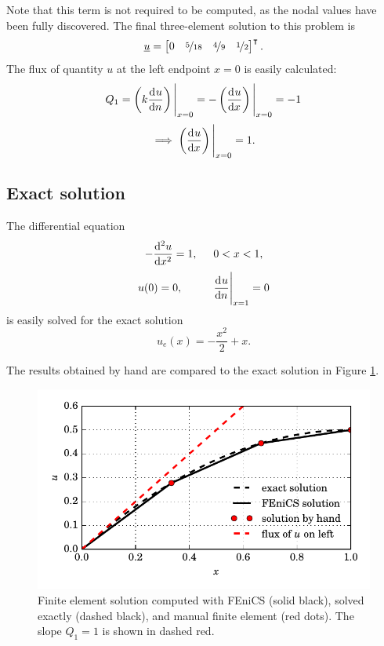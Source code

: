 Note that this term is not required to be computed, as the nodal values have been fully discovered.  The final three-element solution to this problem is
$$\rankone{u} = \begin{bmatrix} 0 & \nicefrac{5}{18} & \nicefrac{4}{9} & \nicefrac{1}{2} \end{bmatrix}\T.$$
The flux of quantity $u$ at the left endpoint $x = 0$ is easily calculated:
$$Q_1 = \left(k \totder{u}{n} \right) \Bigg|_{x=0} = - \left(\totder{u}{x} \right) \Bigg|_{x=0} = -1$$ 
$$\implies \left(\totder{u}{x} \right) \Bigg|_{x=0} = 1.$$

\subsection{Exact solution}

The differential equation
$$- \totder[2]{u}{x} = 1, \hspace{5mm} 0 < x < 1,$$
$$u(0) = 0, \hspace{10mm} \totder{u}{n} \Bigg|_{x=1} = 0$$
is easily solved for the exact solution
$$u_e(x) = -\frac{x^2}{2} + x.$$

The results obtained by hand are compared to the exact solution in Figure \ref{scratch_ex_image}.

\begin{figure}
  \centering
    \includegraphics[width=\linewidth]{images/fenics_intro/scratch_example.pdf}
  \caption[Introductory FEM example solution]{Finite element solution computed with FEniCS (solid black), solved exactly (dashed black), and manual finite element (red dots).  The slope $Q_1 = 1$ is shown in dashed red.}
  \label{scratch_ex_image}
\end{figure}


